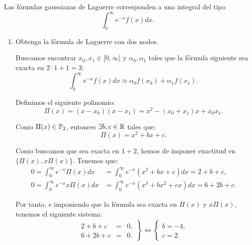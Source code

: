 \begin{ejercicio}\label{ej:2.1.28} Las fórmulas gaussianas de Laguerre corresponden a una integral del tipo
    \begin{equation*}
        \int_{0}^{\infty} e^{-x} f(x) dx.
    \end{equation*}
    \begin{enumerate}
        \item Obtenga la fórmula de Laguerre con dos nodos.
        
        Buscamos encontrar $x_0,x_1\in [0, \infty[$ y $\alpha_0, \alpha_1$ tales que la fórmula siguiente sea exacta en $2\cdot 1+1 = 3$:
        \begin{equation*}
            \int_{0}^{\infty} e^{-x} f(x) dx \approx \alpha_0 f(x_0) + \alpha_1 f(x_1).
        \end{equation*}

        Definimos el siguiente polinomio:
        \begin{equation*}
            \Pi(x) = (x-x_0)(x-x_1) = x^2 - (x_0+x_1)x + x_0x_1.
        \end{equation*}

        Como $\Pi(x)\in \mathbb{P}_2$, entonces $\exists b,c\in \mathbb{R}$ tales que:
        \begin{equation*}
            \Pi(x) = x^2 + bx + c.
        \end{equation*}

        Como buscamos que sea exacta en $1+2$, hemos de imponer exactitud en $\{\Pi(x), x\Pi(x)\}$. Tenemos que:
        \begin{align*}
            0 = \int_{0}^{\infty} e^{-x}\Pi(x) dx &= \int_{0}^{\infty} e^{-x}(x^2 + bx + c) dx = 2 + b + c,\\
            0 = \int_{0}^{\infty} e^{-x} x\Pi(x) dx &= \int_{0}^{\infty} e^{-x}(x^3 + bx^2 + cx) dx = 6 + 2b + c.
        \end{align*}

        Por tanto, e imponiendo que la fórmula sea exacta en $\Pi(x)$ y $x\Pi(x)$, tenemos el siguiente sistema:
        \begin{align*}
            \left.
            \begin{array}{rcl}
                2 + b + c &=& 0,\\
                6 + 2b + c &=& 0.
            \end{array}
            \right\}
            \iff
            \left\{
            \begin{array}{rcl}
                b = -4,\\
                c = 2.
            \end{array}
            \right.
        \end{align*}


\end{enumerate}
\end{ejercicio}
